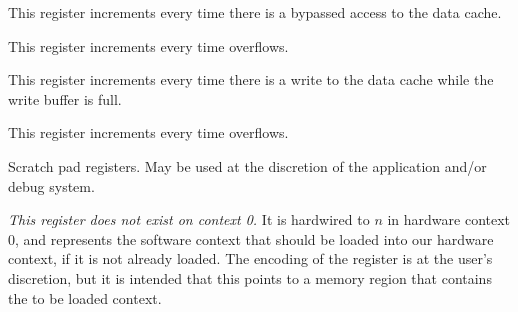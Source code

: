 
This register increments every time there is a bypassed access to the data cache.

\debugCanWrite{}


This register increments every time  overflows.

\debugCanWrite{}


This register increments every time there is a write to the data cache while
the write buffer is full.

\debugCanWrite{}


This register increments every time  overflows.

\debugCanWrite{}


Scratch pad registers. May be used at the discretion of the application and/or
debug system.

\debugCanWrite{}
\coreCanWrite{}


\emph{This register does not exist on context 0.} It is hardwired to
$n$ in hardware context 0, and represents the software context that
should be loaded into our hardware context, if it is not already loaded. The
encoding of the register is at the user's discretion, but it is intended that
this points to a memory region that contains the to be loaded context.

